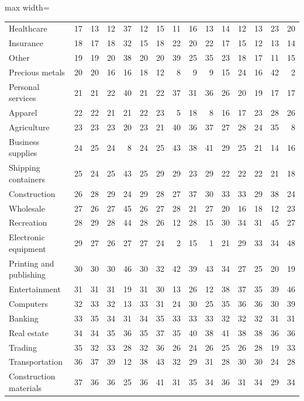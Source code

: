 \begin{table}[!htbp]
\begin{adjustbox}{max width=\textwidth}
\begin{tabular}{lrrrrrrrrrrrrrr}
Healthcare & 17 & 13 & 12 & 37 & 12 & 15 & 11 & 16 & 13 & 14 & 12 & 13 & 23 & 20 \\
Insurance & 18 & 17 & 18 & 32 & 15 & 18 & 22 & 20 & 22 & 17 & 15 & 12 & 13 & 14 \\
Other & 19 & 19 & 20 & 38 & 20 & 20 & 39 & 25 & 35 & 23 & 18 & 17 & 11 & 15 \\
Precious metals & 20 & 20 & 16 & 16 & 18 & 12 & 8 & 9 & 9 & 15 & 24 & 16 & 42 & 2 \\
Personal services & 21 & 21 & 22 & 40 & 21 & 22 & 37 & 31 & 36 & 26 & 20 & 19 & 17 & 17 \\
Apparel & 22 & 22 & 21 & 21 & 22 & 23 & 5 & 18 & 8 & 16 & 17 & 23 & 28 & 26 \\
Agriculture & 23 & 23 & 23 & 20 & 23 & 21 & 40 & 36 & 37 & 27 & 28 & 24 & 35 & 8 \\
Business supplies & 24 & 25 & 24 & 8 & 24 & 25 & 43 & 38 & 41 & 29 & 25 & 21 & 14 & 16 \\
Shipping containers & 25 & 24 & 25 & 43 & 25 & 29 & 29 & 23 & 29 & 22 & 22 & 22 & 21 & 18 \\
Construction & 26 & 28 & 29 & 24 & 29 & 28 & 27 & 37 & 30 & 33 & 33 & 29 & 38 & 24 \\
Wholesale & 27 & 26 & 27 & 45 & 26 & 27 & 28 & 21 & 27 & 20 & 16 & 18 & 12 & 23 \\
Recreation & 28 & 29 & 28 & 44 & 28 & 26 & 12 & 28 & 15 & 30 & 34 & 31 & 45 & 27 \\
Electronic equipment & 29 & 27 & 26 & 27 & 27 & 24 & 2 & 15 & 1 & 21 & 29 & 33 & 34 & 48 \\
Printing and publishing & 30 & 30 & 30 & 46 & 30 & 32 & 42 & 39 & 43 & 34 & 27 & 25 & 20 & 19 \\
Entertainment & 31 & 31 & 31 & 19 & 31 & 30 & 13 & 26 & 12 & 38 & 37 & 35 & 39 & 46 \\
Computers & 32 & 33 & 32 & 13 & 33 & 31 & 24 & 30 & 25 & 35 & 36 & 36 & 30 & 39 \\
Banking & 33 & 35 & 34 & 31 & 34 & 35 & 33 & 33 & 33 & 32 & 32 & 32 & 31 & 31 \\
Real estate & 34 & 34 & 35 & 36 & 35 & 37 & 35 & 40 & 38 & 41 & 38 & 38 & 36 & 36 \\
Trading & 35 & 32 & 33 & 28 & 32 & 36 & 26 & 24 & 26 & 25 & 26 & 28 & 19 & 33 \\
Transportation & 36 & 37 & 39 & 12 & 38 & 43 & 32 & 29 & 31 & 28 & 30 & 30 & 24 & 28 \\
Construction materials & 37 & 36 & 36 & 25 & 36 & 41 & 31 & 35 & 34 & 36 & 31 & 34 & 29 & 34 \\

\end{tabular}
\end{adjustbox}
\end{table}
